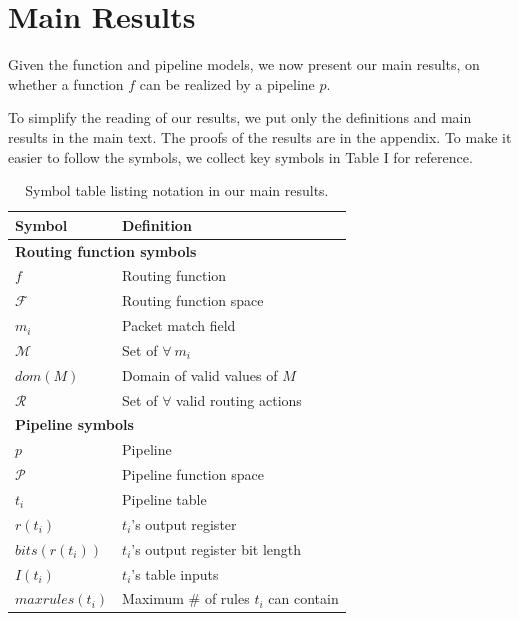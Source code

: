 \section{Main Results}
\label{sec:main-results}

Given the function and pipeline models, we now present our main results, on whether a function $f$ can be realized by a pipeline $p$.

To simplify the reading of our results, we put only the definitions and main results in the main text. The proofs of the results are in the appendix. To make it easier to follow the symbols, we collect key symbols in Table I for reference.

\begin{table}
\centering
\begin{tabular}{| l | l |}
  \hline
  \textbf{Symbol} & \textbf{Definition}\\
  \hline
  \hline
  \multicolumn{2}{|l|}{\textbf{Routing function symbols}} \\
  \hline
  $f$ & Routing function\\
  $\mathcal{F}$ & Routing function space\\
  $m_i$ & Packet match field\\
  $\mathcal{M}$ & Set of $\forall\ m_i$\\
  $dom(M)$ & Domain of valid values of $M$\\
  $\mathcal{R}$ & Set of $\forall$ valid routing actions\\ 
  \hline
  \hline
  \multicolumn{2}{|l|}{\textbf{Pipeline symbols}} \\
  \hline
  $p$ & Pipeline\\
  $\mathcal{P}$ & Pipeline function space\\
  $t_i$ & Pipeline table\\
  $r(t_i)$ & $t_i$'s output register\\
  $bits(r(t_i))$ & $t_i$'s output register bit length\\
  $I(t_i)$ & $t_i$'s table inputs\\
  $maxrules(t_i)$ & Maximum $\#$ of rules $t_i$ can contain\\
  \hline
\end{tabular}
\vspace{2mm}
\label{tbl:sym-table}
\caption{Symbol table listing notation in our main results.}
\end{table}


